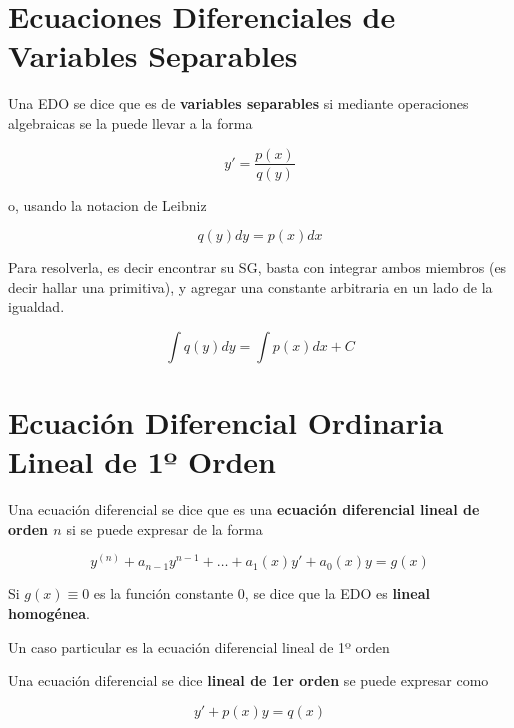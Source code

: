 \section{Ecuaciones Diferenciales de Variables Separables}

\begin{definition}
Una EDO se dice que es de \textbf{variables separables}  si mediante operaciones algebraicas se la puede llevar a la forma

$$ y' = \frac{p(x)}{q(y)} $$

o, usando la notacion de Leibniz

$$ q(y)dy = p(x)dx $$

\end{definition}

Para resolverla, es decir encontrar su SG, basta con integrar ambos miembros (es decir hallar una primitiva), y agregar una constante arbitraria en un lado de la igualdad.

$$ \int q(y)dy = \int p(x)dx + C$$

\section{Ecuación Diferencial Ordinaria Lineal de 1º Orden}

\begin{definition} \label{edo_lineal_orden_n}

Una ecuación diferencial se dice que es una \textbf{ecuación diferencial lineal de orden $n$}  si se puede expresar de la forma

$$ y^{(n)} + a_{n-1}y^{n-1} + \ldots + a_1(x)y' + a_0(x) y = g(x) $$

Si $ g(x) \equiv 0$ es la función constante 0, se dice que la EDO es \textbf{lineal homogénea}. 

\end{definition}

Un caso particular es la ecuación diferencial lineal de 1º orden

\begin{definition}

Una ecuación diferencial se dice \textbf{lineal de 1er orden}  se puede expresar como

$$ y' + p(x) y = q(x) $$

\end{definition}

